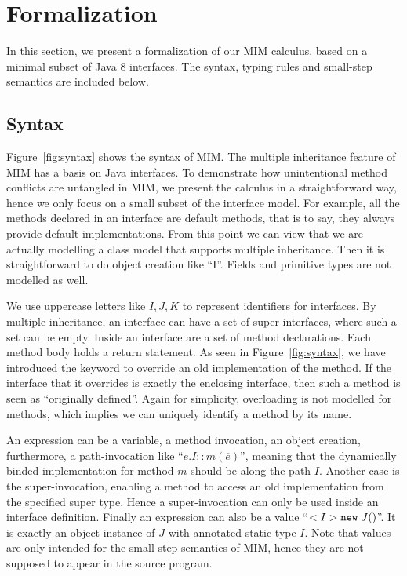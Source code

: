 \section{Formalization}

In this section, we present a formalization of our MIM calculus, based on
a minimal subset of Java 8 interfaces. The syntax, typing rules and small-step
semantics are included below.

\subsection{Syntax}
Figure~\ref{fig:syntax} shows the syntax of MIM. The multiple inheritance feature
of MIM has a basis on Java interfaces. To demonstrate how unintentional method conflicts
are untangled in MIM, we present the calculus in a straightforward way, hence we only
focus on a small subset of the interface model. For example, all the methods declared in an
interface are default methods, that is to say, they always provide default implementations.
From this point we can view that we are actually modelling a class model that supports multiple
inheritance. Then it is straightforward to do object creation like ``\new I''. Fields and
primitive types are not modelled as well.

We use uppercase letters like $I, J, K$ to represent identifiers for interfaces. By multiple inheritance,
an interface can have a set of super interfaces, where such a set can be empty. Inside an interface are a
set of method declarations. Each method body holds a return statement. As seen in Figure~\ref{fig:syntax},
we have introduced the \kwoverride keyword to override an old implementation of the method. If the interface
that it overrides is exactly the enclosing interface, then such a method is seen as ``originally defined''.
Again for simplicity, overloading is not modelled for methods, which implies we can uniquely identify a method
by its name.

An expression can be a variable, a method invocation, an object creation, furthermore, a path-invocation like
``$e.I::m(\overline{e})$'', meaning that the dynamically binded implementation for method $m$ should be along
the path $I$. Another case is the super-invocation, enabling a method to access an old implementation from the
specified super type. Hence a super-invocation can only be used inside an interface definition. Finally an expression
can also be a value ``$<I> \texttt{new} \; J()$''. It is exactly an object instance of $J$ with annotated static type $I$.
Note that values are only intended for the small-step semantics of MIM, hence they are not supposed to appear in the source program.

